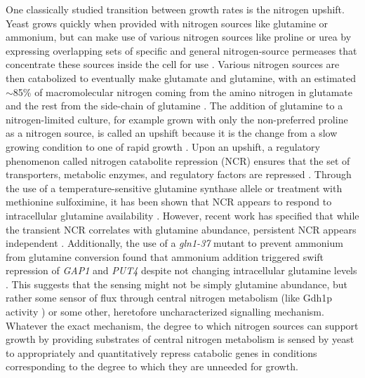 One classically studied transition between growth rates is the 
nitrogen upshift. Yeast grows quickly when provided with nitrogen 
sources like glutamine or ammonium, but can make use of 
various nitrogen sources like proline or urea by 
expressing overlapping sets of specific and general nitrogen-source 
permeases that concentrate these sources inside the cell for use
\parencite{grenson1992amino}.
Various
nitrogen sources are then catabolized to eventually make glutamate and
glutamine, with an estimated $\sim$85\% of macromolecular nitrogen coming
from the amino nitrogen in glutamate and the rest from the side-chain
of glutamine 
\parencite{magasanik2002nitrogen}. The addition of glutamine to
a nitrogen-limited culture, for example grown with only the
non-preferred proline as a nitrogen source, is called an upshift
because it is the change from a slow growing condition to one of rapid
growth \parencite{kjeldgaard1958transition,waldron1977synthesis}. 
Upon an upshift, a regulatory phenomenon called nitrogen
catabolite repression (NCR) ensures that the set of transporters,
metabolic enzymes, and regulatory factors are repressed
\parencite{cooper1982nitrogen,cooper2002transmitting,magasanik2002nitrogen}. 
Through the use of a temperature-sensitive glutamine synthase
allele or treatment with methionine sulfoximine, it has been shown
that NCR appears to respond to intracellular glutamine availability 
\parencite{grenson1983inactivation,stracka2014nitrogen,crespo2002tor}.
However, recent work has specified that while the transient NCR
correlates with glutamine abundance, persistent NCR appears independent
\parencite{fayyad2016yeast}. Additionally, the use of a
\textit{gln1-37} mutant to prevent ammonium from glutamine conversion
found that ammonium addition triggered swift repression of
\textit{GAP1} and \textit{PUT4} despite not changing intracellular
glutamine levels \parencite{ter1998repression}. 
This suggests that the sensing might not be
simply glutamine abundance, but rather some sensor of flux through 
central nitrogen metabolism (like Gdh1p activity
\parencite{fayyad2016yeast}) or some other,
heretofore uncharacterized signalling mechanism.
Whatever the exact mechanism, the degree to which nitrogen sources
can support growth by providing substrates of central nitrogen
metabolism is sensed by yeast to appropriately and quantitatively
repress catabolic genes in conditions corresponding to the degree
to which they are unneeded for growth.

